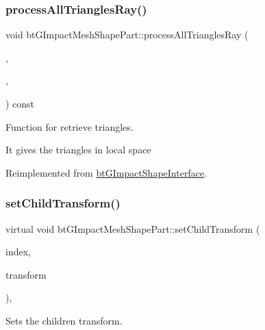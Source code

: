 \subsubsection{\texorpdfstring{process\+All\+Triangles\+Ray()}{processAllTrianglesRay()}\hspace{0.1cm}{\footnotesize\ttfamily [2/2]}}
{\footnotesize\ttfamily void bt\+G\+Impact\+Mesh\+Shape\+Part\+::process\+All\+Triangles\+Ray (\begin{DoxyParamCaption}\item[{\hyperlink{classbtTriangleCallback}{bt\+Triangle\+Callback} $\ast$}]{,  }\item[{const bt\+Vector3 \&}]{,  }\item[{const bt\+Vector3 \&}]{ }\end{DoxyParamCaption}) const\hspace{0.3cm}{\ttfamily [virtual]}}



Function for retrieve triangles. 

It gives the triangles in local space 

Reimplemented from \hyperlink{classbtGImpactShapeInterface_af67273183582c6696169ee4ae5d6cf37}{bt\+G\+Impact\+Shape\+Interface}.

\mbox{\label{classbtGImpactMeshShapePart_a0a97d3769fb7d3f583e41da6b284bcc1}} 
\subsubsection{\texorpdfstring{set\+Child\+Transform()}{setChildTransform()}\hspace{0.1cm}{\footnotesize\ttfamily [1/2]}}
{\footnotesize\ttfamily virtual void bt\+G\+Impact\+Mesh\+Shape\+Part\+::set\+Child\+Transform (\begin{DoxyParamCaption}\item[{int}]{index,  }\item[{const bt\+Transform \&}]{transform }\end{DoxyParamCaption})\hspace{0.3cm}{\ttfamily [inline]}, {\ttfamily [virtual]}}



Sets the children transform. 

